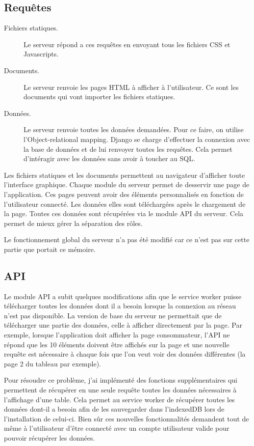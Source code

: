 \documentclass{EPL-master-thesis-covers-FR}
\begin{document}
			\subsection*{Requêtes}
				\begin{description}
					\item[Fichiers statiques.] Le serveur répond a ces requêtes en envoyant tous les fichiers CSS et Javascripts.
					\item[Documents.] Le serveur renvoie les pages HTML à afficher à l'utilisateur. Ce sont les documents qui vont importer les fichiers statiques.
					\item[Données.] Le serveur renvoie toutes les données demandées. Pour ce faire, on utilise l'Object-relational mapping. Django se charge d'effectuer la connexion avec la base de données et de lui renvoyer toutes les requêtes. Cela permet d'intéragir avec les données sans avoir à toucher au SQL.
				\end{description}

				Les fichiers statiques et les documents permettent au navigateur d'afficher toute l'interface graphique. Chaque module du serveur permet de desservir une page de l'application. Ces pages peuvent avoir des éléments personnalisés en fonction de l'utilisateur connecté. Les données elles sont téléchargées après le chargement de la page. Toutes ces données sont récupérées via le module API du serveur. Cela permet de mieux gérer la séparation des rôles. 		
				
				Le fonctionnement global du serveur n'a pas été modifié car ce n'est pas sur cette partie que portait ce mémoire.
				
			\subsection*{API}
				\label{sec:api}
				Le module API a subit quelques modifications afin que le service worker puisse télécharger toutes les données dont il a besoin lorsque la connexion au réseau n'est pas disponible. La version de base du serveur ne permettait que de télécharger une partie des données, celle à afficher directement par la page. Par exemple, lorsque l'application doit afficher la page consommateur, l'API ne répond que les 10 éléments doivent être affichés sur la page et une nouvelle requête est nécessaire à chaque fois que l'on veut voir des données différentes (la page 2 du tableau par exemple).
				
				Pour résoudre ce problème, j'ai implémenté des fonctions supplémentaires qui permettent de récupérer en une seule requête toutes les données nécessaires à l'affichage d'une table. Cela permet au service worker de récupérer toutes les données dont-il a besoin afin de les sauvegarder dans l'indexedDB lors de l'installation de celui-ci. Bien sûr ces nouvelles fonctionnalités demandent tout de même à l'utilisateur d'être connecté avec un compte utilisateur valide pour pouvoir récupérer les données.
				
\end{document}

